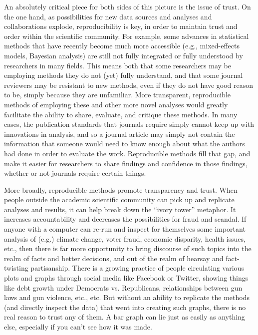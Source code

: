 \documentclass{book}
\begin{document}
An absolutely critical piece for both sides of this picture is the issue of trust.  On the one hand, as possibilities for new data sources and analyses and collaborations explode, reproducibility is key, in order to maintain trust and order within the scientific community.  For example, some advances in statistical methods that have recently become much more accessible (e.g., mixed-effects models, Bayesian analysis) are still not fully integrated or fully understood by researchers in many fields.  This means both that some researchers may be employing methods they do not (yet) fully understand, and that some journal reviewers may be resistant to new methods, even if they do not have good reason to be, simply because they are unfamiliar. More transparent, reproducible methods of employing these and other more novel analyses would greatly facilitate the ability to share, evaluate, and critique these methods. In many cases, the publication standards that journals require simply cannot keep up with innovations in analysis, and so a journal article may simply not contain the information that someone would need to know enough about what the authors had done in order to evaluate the work. Reproducible methods fill that gap, and make it easier for researchers to share findings and confidence in those findings, whether or not journals require certain things.

More broadly, reproducible methods promote transparency and trust.  When people outside the academic scientific community can pick up and replicate analyses and results, it can help break down the ``ivory tower'' metaphor.  It increases accountability and decreases the possibilities for fraud and scandal. If anyone with a computer can re-run and inspect for themselves some important analysis of (e.g.) climate change, voter fraud, economic disparity, health issues, etc., then there is far more opportunity to bring discourse of such topics into the realm of facts and better decisions, and out of the realm of hearsay and fact-twisting partisanship.  There is a growing practice of people circulating various plots and graphs through social media like Facebook or Twitter, showing things like debt growth under Democrats vs. Republicans, relationships between gun laws and gun violence, etc., etc.  But without an ability to replicate the methods (and directly inspect the data) that went into creating such graphs, there is no real reason to trust any of them.  A bar graph can lie just as easily as anything else, especially if you can't see how it was made. 
\end{document}

